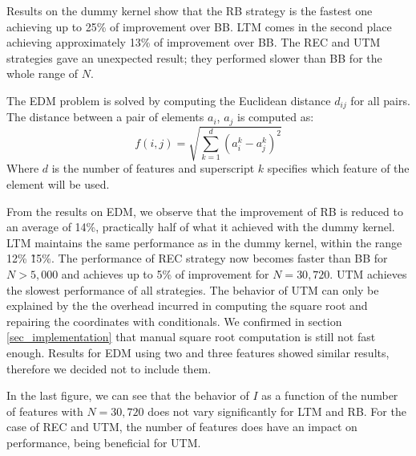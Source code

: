 \documentclass[conference]{IEEEtran}
\begin{document}
Results on the dummy kernel show that the RB strategy is the fastest one achieving up to 25\% of improvement over BB. LTM comes in the second place achieving approximately 13\% of improvement over BB. 
The REC and UTM strategies gave an unexpected result; they performed slower than BB for the whole range of $N$.

The EDM problem is solved by computing the Euclidean distance $d_{ij}$ for all pairs. The distance between a pair of elements 
$a_i$, $a_j$ is computed as:
\begin{equation}
f(i,j) = \sqrt{\sum_{k=1}^{d}({a_i^k} - {a_j^k})^2}
\end{equation}
Where $d$ is the number of features and superscript $k$ specifies which feature of the element will be used.

From the results on EDM, we observe that the improvement of RB is reduced to an average of 14\%, practically half of what it achieved with the dummy kernel. 
LTM maintains the same performance as in the dummy kernel, within the range 12\% \~ 15\%. The performance of REC strategy now becomes faster than BB for $N>5,000$ and achieves up to 5\% of improvement 
for $N=30,720$. 
UTM achieves the slowest performance of all strategies. The behavior of UTM can only be explained by the the overhead incurred in computing the square root and repairing the coordinates 
with conditionals. We confirmed in section \ref{sec_implementation} that manual square root computation is still not fast enough. 
Results for EDM using two and three features showed similar results, therefore we decided not to include them.

In the last figure, we can see that the behavior of $I$ as a function of the number of features with $N=30,720$ does not vary significantly for LTM and RB. 
For the case of REC and UTM, the number of features does have an impact on performance, being beneficial for UTM.
\end{document}

